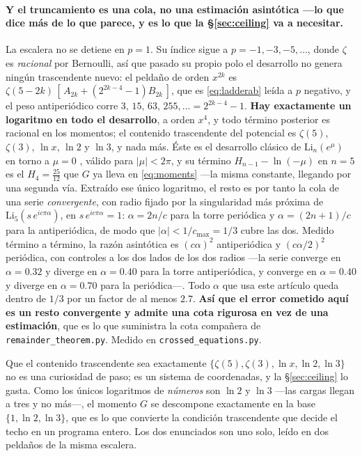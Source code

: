 \documentclass[11pt,a4paper]{article}
\begin{document}
\paragraph{Y el truncamiento es una cola, no una estimación asintótica ---lo que dice más de lo
que parece, y es lo que la \S\ref{sec:ceiling} va a necesitar.} La escalera no se detiene en $p=1$. Su índice sigue a $p=-1,-3,-5,\dots$, donde $\zeta$ es
\emph{racional} por Bernoulli, así que pasado su propio polo el desarrollo no genera ningún
trascendente nuevo: el peldaño de orden $x^{2k}$ es $\zeta(5-2k)\,[\,A_{2k}+(2^{2k-4}-1)B_{2k}\,]$,
que es \eqref{eq:ladderab} leída a $p$ negativo, y el peso antiperiódico corre
$3,\,15,\,63,\,255,\dots=2^{2k-4}-1$. \textbf{Hay exactamente un logaritmo en todo el desarrollo},
a orden $x^4$, y todo término posterior es racional en los momentos; el contenido trascendente del
potencial es $\zeta(5)$, $\zeta(3)$, $\ln x$, $\ln 2$ y $\ln 3$, y nada más. Éste es el desarrollo
clásico de $\mathrm{Li}_n(e^{\mu})$ en torno a $\mu=0$ \cite{Lewin}, válido para $|\mu|<2\pi$, y su
término $H_{n-1}-\ln(-\mu)$ en $n=5$ es el $H_4=\tfrac{25}{12}$ que $G$ ya lleva en
\eqref{eq:moments} ---la misma constante, llegando por una segunda vía. Extraído ese único
logaritmo, el resto es por tanto la cola de una serie \emph{convergente}, con radio fijado por la
singularidad más próxima de $\mathrm{Li}_5(s\,e^{ic\pi\alpha})$, en $s\,e^{ic\pi\alpha}=1$:
$\alpha=2n/c$ para la torre periódica y $\alpha=(2n+1)/c$ para la antiperiódica, de modo que
$|\alpha|<1/c_{\max}=1/3$ cubre las dos. Medido término a término, la razón asintótica es
$(c\alpha)^2$ antiperiódica y $(c\alpha/2)^2$ periódica, con controles a los dos lados de los dos
radios ---la serie converge en $\alpha=0.32$ y diverge en $\alpha=0.40$ para la torre
antiperiódica, y converge en $\alpha=0.40$ y diverge en $\alpha=0.70$ para la periódica---. Todo
$\alpha$ que usa este artículo queda dentro de $1/3$ por un factor de al menos $2.7$. \textbf{Así
que el error cometido aquí es un resto convergente y admite una cota rigurosa en vez de una
estimación}, que es lo que suministra la cota compañera de
\texttt{remainder\_\allowbreak theorem.py}. Medido en \texttt{crossed\_\allowbreak equations.py}.

Que el contenido trascendente sea exactamente $\{\zeta(5),\zeta(3),\ln x,\ln 2,\ln 3\}$ no es una
curiosidad de paso; es un sistema de coordenadas, y la \S\ref{sec:ceiling} lo gasta. Como los
únicos logaritmos de \emph{números} son $\ln2$ y $\ln3$ ---las cargas llegan a tres y no más---,
el momento $G$ se descompone exactamente en la base $\{1,\ln2,\ln3\}$, que es lo que convierte la
condición trascendente que decide el techo en un programa entero. Los dos enunciados son uno solo,
leído en dos peldaños de la misma escalera.
\end{document}
